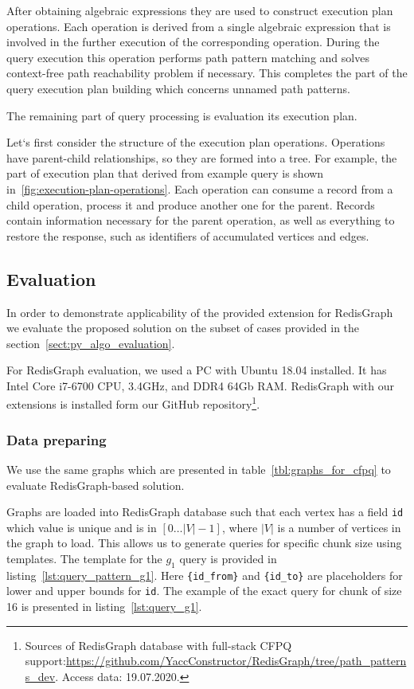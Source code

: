 After obtaining algebraic expressions they are used to construct execution plan operations. Each operation is derived from a single algebraic expression that is involved in the further execution of the corresponding operation.  During the query execution this operation performs path pattern matching and solves context-free path reachability problem if necessary. This completes the part of the query execution plan building which concerns unnamed path patterns.


The remaining part of query processing is evaluation its execution plan.

Let`s first consider the structure of the execution plan operations. Operations have parent-child relationships, so they are formed into a tree. For example, the part of execution plan that derived from example query is shown in~\autoref{fig:execution-plan-operations}. Each operation can consume a record from a child operation, process it and produce another one for the parent. Records contain information necessary for the parent operation, as well as everything to restore the response, such as identifiers of accumulated vertices and edges.


\subsection{Evaluation}

In order to demonstrate applicability of the provided extension for RedisGraph we evaluate the proposed solution on the subset of cases provided in the section~\ref{sect:py_algo_evaluation}.

For RedisGraph evaluation, we used a PC with Ubuntu 18.04 installed.
It has Intel Core i7-6700 CPU, 3.4GHz, and DDR4 64Gb RAM. 
RedisGraph with our extensions is installed form our GitHub repository\footnote{Sources of RedisGraph database with full-stack CFPQ support:\url{https://github.com/YaccConstructor/RedisGraph/tree/path_patterns_dev}. Access data: 19.07.2020.}. 

\subsubsection{Data preparing}

We use the same graphs which are presented in table~\ref{tbl:graphs_for_cfpq} to evaluate RedisGraph-based solution.

Graphs are loaded into RedisGraph database such that each vertex has a field \verb|id| which value is unique and is in $[0 \ldots |V|-1]$, where $|V|$ is a number of vertices in the graph to load.
This allows us to generate queries for specific chunk size using templates.
The template for the $g_1$ query is provided in listing~\ref{lst:query_pattern_g1}.
Here \texttt{\{id\_from\}} and \texttt{\{id\_to\}} are placeholders for lower and upper bounds for \verb|id|. The example of the exact query for chunk of size 16 is presented in listing~\ref{lst:query_g1}.

